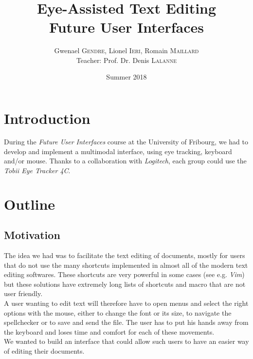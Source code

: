 \documentclass[12pt, a4paper, twoside]{article}
\title{\huge{\textbf{Eye-Assisted Text Editing }\\ Future User Interfaces}}
\author{Gwenael \textsc{Gendre}, Lionel \textsc{Ieri}, Romain \textsc{Maillard} \\
	Teacher: Prof. Dr. Denis \textsc{Lalanne}}
\date{Summer 2018}
\begin{document}
 
\begin{titlepage}
\maketitle
\end{titlepage}
\tableofcontents
\newpage

\section{Introduction}
During the \textit{Future User Interfaces} course at the University of Fribourg, we had to develop and implement a multimodal interface, using eye tracking, keyboard and/or mouse. Thanks to a collaboration with \textit{Logitech}, each group could use the \textit{Tobii Eye Tracker 4C}. 

\section{Outline}

\subsection{Motivation}
The idea we had was to facilitate the text editing of documents, mostly for users that do not use the many shortcuts implemented in almost all of the modern text editing softwares. These shortcuts are very powerful in some cases (see e.g. \textit{Vim}) but these solutions have extremely long lists of shortcuts and macro that are not user friendly.\\
A user wanting to edit text will therefore have to open menus and select the right options with the mouse, either to change the font or its size, to navigate the spellchecker or to save and send the file. The user has to put his hands away from the keyboard and loses time and comfort for each of these movements. \\
We wanted to build an interface that could allow such users to have an easier way of editing their documents. 
\end{document}
